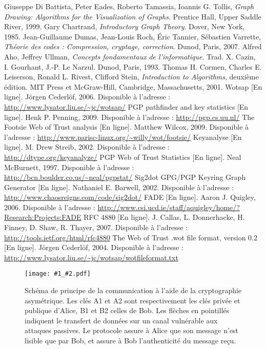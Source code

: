 \documentclass[a4paper]{article}
\newcommand{\sch}[3]{
\begin{figure}
\centering
\texttt{[image: \#1\_\#2.pdf]}
\caption{#3}
\label{sch_#2}
\end{figure}
}
\begin{document}
\begin{thebibliography}{WW}
	 Giuseppe Di Battista, Peter Eades, Roberto Tamassia, Ioannis G. Tollis, \emph{Graph Drawing: Algorithms for the Visualization of Graphs}. Prentice Hall, Upper Saddle River, 1999.
         Gary Chartrand, \emph{Introductory Graph Theory}. Dover, New York, 1985.
         Jean-Guillaume Dumas, Jean-Louis Roch, Éric Tannier, Sébastien Varrette, \emph{Théorie des codes : Compression, cryptage, correction}. Dunod, Paris, 2007.
         Alfred Aho, Jeffrey Ullman, \emph{Concepts fondamentaux de l'informatique}. Trad. X. Cazin, I. Gourhant, J.-P. Le Narzul. Dunod, Paris, 1993.
         Thomas H. Cormen, Charles E. Leiserson, Ronald L. Rivest, Clifford Stein, \emph{Introduction to Algorithms}, deuxième édition. MIT Press et McGraw-Hill, Cambridge, Massachusetts, 2001.
         Wotsap [En ligne]. Jörgen Cederlöf, 2006. Disponible à l'adresse : \url{http://www.lysator.liu.se/~jc/wotsap/} 
         PGP pathfinder and key statistics [En ligne]. Henk P. Penning, 2009. Disponible à l'adresse : \url{http://pgp.cs.uu.nl/}
         The Footsie Web of Trust analysis [En ligne]. Matthew Wilcox, 2009. Disponible à l'adresse : \url{http://www.parisc-linux.org/~willy/wot/footsie/}
         Keyanalyse [En ligne]. M. Drew Streib, 2002. Disponible à l'adresse : \url{http://dtype.org/keyanalyze/}
         PGP Web of Trust Statistics [En ligne]. Neal McBurnett, 1997. Disponible à l'adresse : \url{http://bcn.boulder.co.us/~neal/pgpstat/} 
         Sig2dot GPG/PGP Keyring Graph Generator [En ligne]. Nathaniel E. Barwell, 2002. Disponible à l'adresse : \url{http://www.chaosreigns.com/code/sig2dot/} 
         FADE [En ligne]. Aaron J. Quigley, 2006. Disponible à l'adresse : \url{http://www.csi.ucd.ie/staff/aquigley/home/?Research:Projects:FADE}
         RFC 4880 [En ligne]. J. Callas, L. Donnerhacke, H. Finney, D. Shaw, R. Thayer, 2007. Disponible à l'adresse : \url{http://tools.ietf.org/html/rfc4880}
         The Web of Trust .wot file format, version 0.2 [En ligne]. Jörgen Cederlöf, 2004. Disponible à l'adresse : \url{http://www.lysator.liu.se/~jc/wotsap/wotfileformat.txt}
\end{thebibliography}




\sch{schemas/sch}{alice_bob}{Schéma de principe de la communication à l'aide de la cryptographie asymétrique. Les clés A1 et A2 sont respectivement les clés privée et publique d'Alice, B1 et B2 celles de Bob. Les flèches en pointillés indiquent le transfert de données sur un canal vulnérable aux attaques passives. Le protocole assure à Alice que son message n'est lisible que par Bob, et assure à Bob l'authenticité du message reçu.}
\end{document}
